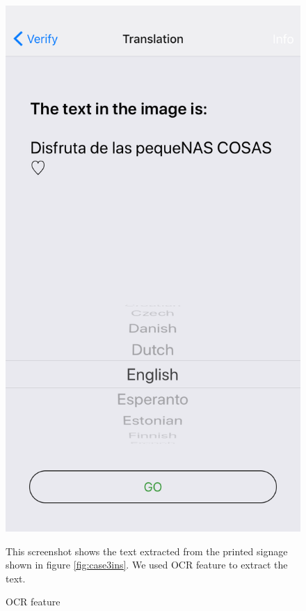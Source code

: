 \documentclass[12pt]{article}
\begin{document}
\begin{figure} [H]
\begin{minipage}{.5\textwidth}
  \includegraphics[width=0.9\linewidth]{media/case3.PNG}
  \caption{OCR feature}{This screenshot shows the text extracted from the printed signage shown in figure \ref{fig:case3ins}. We used OCR feature to extract the text.}
  \label{fig:case3}
\end{minipage}
\end{figure}
\end{document}
